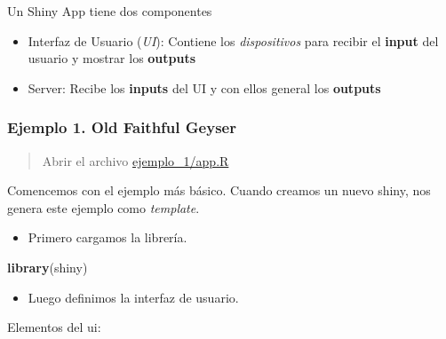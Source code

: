 \documentclass[]{book}
\newenvironment{Shaded}{\begin{snugshade}}{\end{snugshade}}
\newcommand{\KeywordTok}[1]{\textcolor[rgb]{0.13,0.29,0.53}{\textbf{#1}}}
\newcommand{\NormalTok}[1]{#1}
\providecommand{\tightlist}{%
  \setlength{\itemsep}{0pt}\setlength{\parskip}{0pt}}
\begin{document}
Un Shiny App tiene dos componentes

\begin{itemize}
\tightlist
\item
  Interfaz de Usuario (\emph{UI}): Contiene los \emph{dispositivos} para recibir el \textbf{input} del usuario y mostrar los \textbf{outputs}
\item
  Server: Recibe los \textbf{inputs} del UI y con ellos general los \textbf{outputs}
\end{itemize}

\hypertarget{ejemplo-1.-old-faithful-geyser}{%
\subsubsection{Ejemplo 1. Old Faithful Geyser}\label{ejemplo-1.-old-faithful-geyser}}

\begin{quote}
Abrir el archivo \url{ejemplo_1/app.R}
\end{quote}

Comencemos con el ejemplo más básico. Cuando creamos un nuevo shiny, nos genera este ejemplo como \emph{template}.

\begin{itemize}
\tightlist
\item
  Primero cargamos la librería.
\end{itemize}

\begin{Shaded}
\begin{Highlighting}[]
\KeywordTok{library}\NormalTok{(shiny)}
\end{Highlighting}
\end{Shaded}

\begin{itemize}
\tightlist
\item
  Luego definimos la interfaz de usuario.
\end{itemize}

Elementos del ui:
\end{document}
